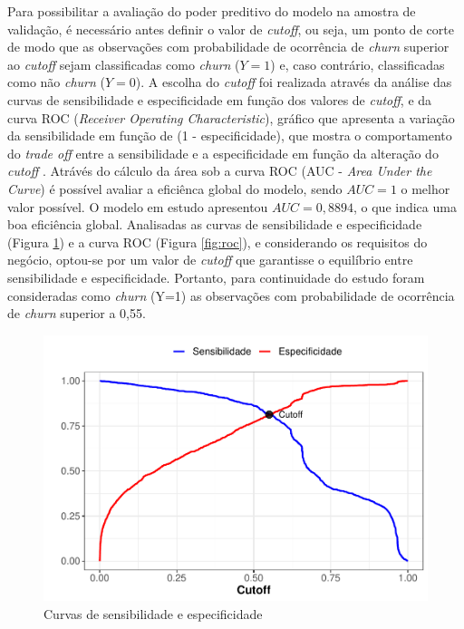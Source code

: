 \documentclass[twocolumn]{rbef}
\newcommand{\1}{\mathbbm{1}}
\begin{document}
Para possibilitar a avaliação do poder preditivo do modelo na amostra de validação, é necessário antes definir o valor de \textit{cutoff}, ou seja, um ponto de corte de modo que as observações com probabilidade de ocorrência de \textit{churn} superior ao \textit{cutoff} sejam classificadas como \textit{churn} (\(Y=1\)) e, caso contrário, classificadas como não \textit{churn} (\(Y=0\)). A escolha do \textit{cutoff} foi realizada através da análise das curvas de sensibilidade e especificidade em função dos valores de \textit{cutoff}, e da curva ROC (\textit{Receiver Operating Characteristic}), gráfico que apresenta a variação da sensibilidade em função de (1 - especificidade), que mostra o comportamento do \textit{trade off} entre a sensibilidade e a especificidade em função da alteração do \textit{cutoff} \cite{Favero2017}. Atrávés do cálculo da área sob a curva ROC (AUC - \textit{Area Under the Curve}) é possível avaliar a eficiênca global do modelo, sendo \(AUC=1\) o melhor valor possível. O modelo em estudo apresentou \(AUC = 0,8894\), o que indica uma boa eficiência global. Analisadas as curvas de sensibilidade e especificidade (Figura \ref{fig:senscurve}) e a curva ROC (Figura \ref{fig:roc}), e considerando os requisitos do negócio, optou-se por um valor de \textit{cutoff} que garantisse o equilíbrio entre sensibilidade e especificidade. Portanto, para continuidade do estudo foram consideradas como \textit{churn} (Y=1) as observações com probabilidade de ocorrência de \textit{churn} superior a 0,55.

\begin{figure}

{\centering \includegraphics[width=1\linewidth]{article_files/figure-latex/senscurve-1} 

}

\caption{Curvas de sensibilidade e especificidade}\label{fig:senscurve}
\end{figure}
\end{document}
